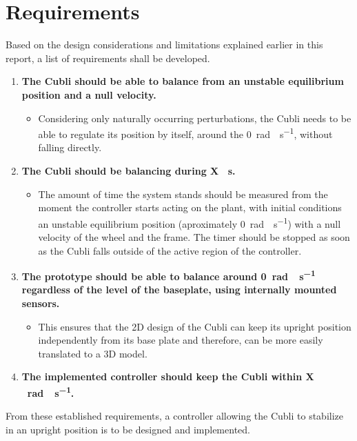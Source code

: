 \chapter{Requirements}\label{chap:requirements}

Based on the design considerations and limitations explained earlier in this report, a list of requirements shall be developed.

\begin{enumerate}
\item \textbf{The Cubli should be able to balance from an unstable equilibrium position and a null velocity.}
  \begin{itemize}
  \item[] Considering only naturally occurring perturbations, the Cubli needs to be able to regulate its position by itself, around the \SI{0}{rad \cdot s^{-1}}, without falling directly.
  \end{itemize}
\item \textbf{The Cubli should be balancing during X \SI{}{s}.}
  \begin{itemize}
  \item[] The amount of time the system stands should be measured from the moment the controller starts acting on the plant, with initial conditions an unstable equilibrium position (aproximately \SI{0}{rad \cdot s^{-1}}) with a null velocity of the wheel and the frame. The timer should be stopped as soon as the Cubli falls outside of the active region of the controller.
  \end{itemize}
\item \textbf{The prototype should be able to balance around \SI{0}{rad \cdot s^{-1}} regardless of the level of the baseplate, using internally mounted sensors.}  
  \begin{itemize}
  \item[] This ensures that the 2D design of the Cubli can keep its upright position independently from its base plate and therefore, can be more easily translated to a 3D model.
  \end{itemize}
\item \textbf{The implemented controller should keep the Cubli within X \SI{}{rad \cdot s^{-1}}.}
\end{enumerate}

From these established requirements, a controller allowing the Cubli to stabilize in an upright position is to be designed and implemented.